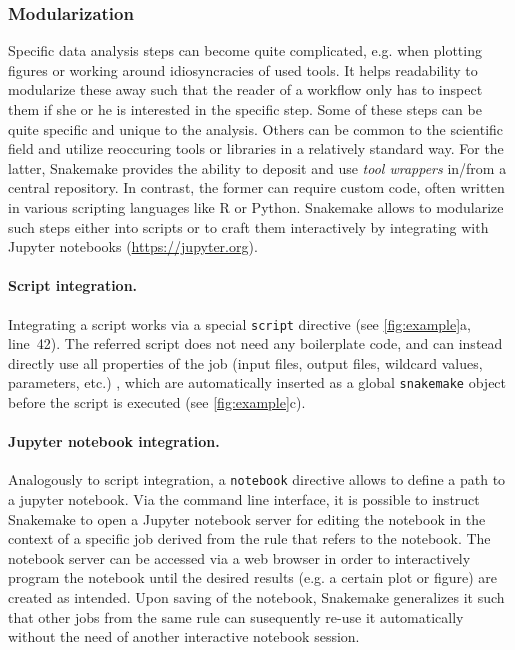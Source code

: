\documentclass[parskip=half]{scrartcl}
\let\plainurl\url
\renewcommand{\url}[1]{\protect\plainurl{#1}}
\begin{document}
\subsubsection{Modularization}\label{sec:modularization}

Specific data analysis steps can become quite complicated, e.g. when plotting figures or working around idiosyncracies of used tools.
It helps readability to modularize these away such that the reader of a workflow only has to inspect them if she or he is interested in the specific step.
Some of these steps can be quite specific and unique to the analysis.
Others can be common to the scientific field and utilize reoccuring tools or libraries in a relatively standard way.
For the latter, Snakemake provides the ability to deposit and use \emph{tool wrappers} in/from a central repository.
In contrast, the former can require custom code, often written in various scripting languages like R or Python.
Snakemake allows to modularize such steps either into scripts or to craft them interactively by integrating with Jupyter notebooks (\url{https://jupyter.org}).

\paragraph{Script integration.}
Integrating a script works via a special \lstinline!script! directive (see \autoref{fig:example}a, line~42).
The referred script does not need any boilerplate code, and can instead directly use all properties of the job (input files, output files, wildcard values, parameters, etc.)
, which are automatically inserted as a global \lstinline!snakemake! object before the script is executed (see \autoref{fig:example}c).

\paragraph{Jupyter notebook integration.}
Analogously to script integration, a \lstinline!notebook! directive allows to define a path to a jupyter notebook.
Via the command line interface, it is possible to instruct Snakemake to open a Jupyter notebook server for editing the notebook in the context of a specific job derived from the rule that refers to the notebook.
The notebook server can be accessed via a web browser in order to interactively program the notebook until the desired results (e.g. a certain plot or figure) are created as intended.
Upon saving of the notebook, Snakemake generalizes it such that other jobs from the same rule can susequently re-use it automatically without the need of another interactive notebook session.
\end{document}
